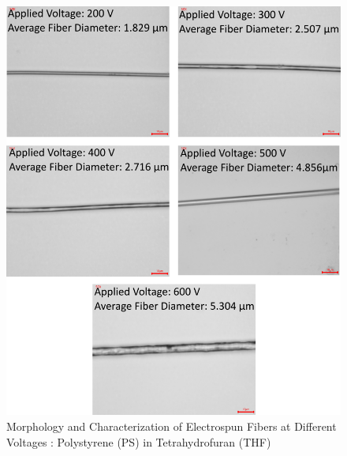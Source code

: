 \begin{figure}[!th]
\centering
\includegraphics[scale=0.55]{./Figures/microscopy_ps_thf.png}
\decoRule
\caption[Morphology and Characterization of Electrospun Fibers at Different Voltages : Polystyrene (PS) in Tetrahydrofuran (THF) ]{Morphology and Characterization of Electrospun Fibers at Different Voltages : Polystyrene (PS) in Tetrahydrofuran (THF) }
\label{fig:microscopy_ps_thf}
\end{figure}

